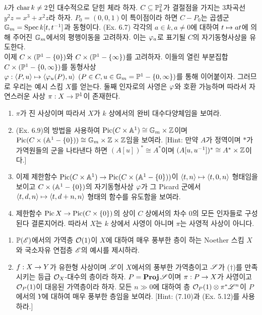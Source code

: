 \begin{enumerate}[label=\tb{7.\arabic*.},itemindent=0mm,itemsep=4mm]
		{\renewcommand{\labelenumi}{\tb{*7.\arabic{enumi}.}}
			\item {} $k$가 $\operatorname{char} k\ne 2$인 대수적으로 닫힌 체라 하자.
			$C\subseteq\mathbb{P}_k^2$가 결절점을 가지는 3차곡선 $y^2z=x^3+x^2z$라 하자.
			$P_0=(0,0,1)$이 특이점이라 하면 $C-P_0$는 곱셈군 $\mathbb{G}_m=\operatorname{Spec} k[t,t^{-1}]$과 동형이다. (Ex. 6.7)
			각각의 $a\in k,a\ne 0$에 대하여 $t\mapsto at$에 의해 주어진 $\mathbb{G}_m$에서의 평행이동을 고려하자.
			이는 $\varphi_a$로 표기될 $C$의 자기동형사상을 유도한다.\\
			이제 $C\times(\mathbb{P}^1-\{0\})$와 $C\times(\mathbb{P}^1-\{\infty\})$를 고려하자.
			이들의 열린 부분집합 $C\times(\mathbb{P}^1-\{0,\infty\})$를 동형사상 $\varphi:\Braket{P,u}\mapsto\Braket{\varphi_u(P),u}\;
			(P\in C,u\in\mathbb{G}_m=\mathbb{P}^1-\{0,\infty\})$를 통해 이어붙이자.
			그러므로 우리는 예시 스킴 $X$를 얻는다. 둘째 인자로의 사영은 $\varphi$와 호환 가능하며 따라서 자연스러운 사상 $\pi:X\rightarrow\mathbb{P}^1$이 존재한다.
			\begin{enumerate}[label=(\alph*)]
				\item $\pi$가 진 사상이며 따라서 $X$가 $k$ 상에서의 완비 대수다양체임을 보여라.
				\item (Ex. 6.9)의 방법을 사용하여 $\operatorname{Pic}(C\times\mathbb{A}^1)\cong\mathbb{G}_m\times\mathbb Z$이며
				$\operatorname{Pic}(C\times(\mathbb{A}^1-\{0\}))\cong\mathbb{G}_m\times\mathbb Z\times\mathbb Z$임을 보여라.
				[Hint: 만약 $A$가 정역이며 $*$가 가역원들의 군을 나타낸다 하면 $(A[u])^*\cong A^*$이며 $(A[u,u^{-1}])^*\cong A^*\times\mathbb Z$이다.]
				\item 이제 제한함수 $\operatorname{Pic}(C\times\mathbb{A}^1)\rightarrow\operatorname{Pic}(C\times(\mathbb{A}^1-\{0\}))$이 $\Braket{t,n}\mapsto\Braket{t,0,n}$ 형태임을 보이고
				$C\times(\mathbb{A}^1-\{0\})$의 자기동형사상 $\varphi$가 그 Picard 군에서 $\Braket{t,d,n}\mapsto\Braket{t,d+n,n}$ 형태의 함수를 유도함을 보여라.
				\item 제한함수 $\operatorname{Pic} X\rightarrow\operatorname{Pic}(C\times\{0\})$의 상이 $C$ 상에서의 차수 0의 모든 인자들로 구성된다 결론지어라.
				따라서 $X$는 $k$ 상에서 사영이 아니며 $\pi$는 사영적 사상이 아니다.
		\end{enumerate}}
		\item \begin{enumerate}[label=(\alph*)]
			\item $\mathbb{P}(\mathscr{E})$에서의 가역층 $\mathcal{O}(1)$이 $X$에 대하여 매우 풍부한 층이  하는
			Noether 스킴 $X$와 국소자유 연접층 $\mathscr{E}$의 예시를 제시하라.
			\item $f:X\rightarrow Y$가 유한형 사상이며 $\mathscr{L}$이 $X$에서의 풍부한 가역층이고
			$\mathscr{S}$가 ($\dag$)를 만족시키는 등급 $\mathcal{O}_X$-대수의 층이라 하자.
			$P=\operatorname{\mathbf{Proj}}\mathscr{S}$이며 $\pi:P\rightarrow X$가 사영이고 $\mathcal{O}_P(1)$이 대응된 가역층이라 하자.
			모든 $n\gg 0$에 대하여 층 $\mathcal{O}_P(1)\otimes\pi^*\mathscr{L}^n$이 $P$에서의 $Y$에 대하여 매우 풍부한 층임을 보여라.
			[Hint: (7.10)과 (Ex. 5.12)를 사용하라.]
		\end{enumerate}
	\end{enumerate}
	
